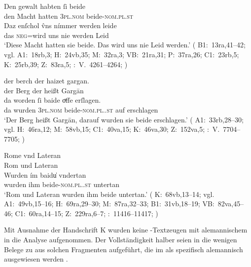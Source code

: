 \begin{exe}
\ex \label{ex:neutralpos}
	\gll Den gewalt habten ſi beide \\
		den Macht hatten \textsc{3pl\subM.nom} beide-\textsc{nom.pl\subM.st} \\
\sn \gll Daz enſchol v̂ns nímmer werden leide \\
		das \textsc{neg}=wird uns nie werden Leid \\
	\trans `Diese Macht hatten sie beide. Das wird uns nie Leid werden.'
		(%
			B1:~13ra,41--42; vgl.
			A1:~18rb,3;
			H:~24vb,35;
			M:~32ra,3;
			VB:~21ra,31;
			P:~37ra,26;
			C1:~23rb,5;
			K:~25rb,39;
			Z:~83ra,5;
			\KC:~V.~4261--4264;
			\cite[159]{schroeder1895}%
		)

\ex \label{ex:neutralpos2}
	\begin{xlist}
	\ex \label{ex:neutralpos2_1}
		\gll der berch der haizet gargan. \\
			der Berg der heißt Gargān \\
	\sn \gll da worden ſi baide oͮffe erſlagen. \\
			da wurden \textsc{3pl\subM.nom} beide-\textsc{nom.pl.\MascM.st} auf
				erschlagen \\
		\trans `Der Berg heißt Gargān, darauf wurden sie beide erschlagen.'
			(%
				A1:~33rb,28--30; vgl.
				H:~46ra,12;
				M:~58vb,15;
				C1:~40va,15;
				K:~46va,30;
				Z:~152va,5;
				\KC:~V.~7704--7705;
				\cite[222]{schroeder1895}%
			)

	\ex \label{ex:neutralpos2_2}
		\gll Rome vnd Lateran \\
			Rom und Lateran \\
	\sn \gll Wurden ím baidu̍ vndertan \\
			wurden ihm beide-\textsc{nom.pl.\NeutI.st} untertan \\
		\trans `Rom und Lateran wurden ihm beide untertan.'
			(%
				K:~68vb,13--14; vgl.
				A1:~49vb,15--16;
				H:~69ra,29--30;
				M:~87ra,32--33;
				B1:~31vb,18--19;
				VB:~82va,45--46;
				C1:~60ra,14--15;
				Z:~229ra,6--7;
				\KC:~11416--11417;
				\cite[290]{schroeder1895}%
			)
		\\
	\end{xlist}
\end{exe}

Mit Ausnahme der Handschrift K wurden keine \KC{}-Text\-zeugen mit
alemannischem  in die Analyse aufgenommen.
Der Vollständigkeit halber seien in  die wenigen Belege zu
 aus solchen Fragmenten aufgeführt, die im
 \nosh\autocite{hsc} als spezifisch
alemannisch ausgewiesen werden \autocite[vgl.][4, 44,
54]{wolf:kckat}.

